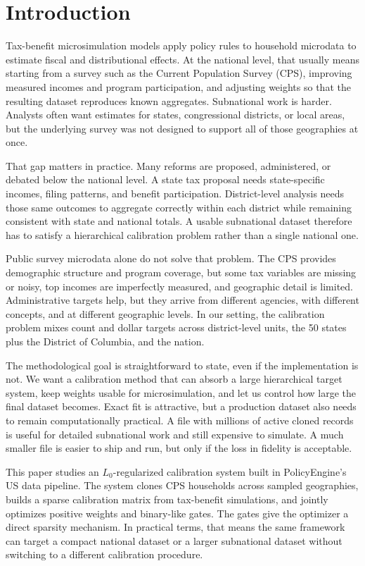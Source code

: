 \section{Introduction}
\label{sec:introduction}

Tax-benefit microsimulation models apply policy rules to household microdata to estimate fiscal
and distributional effects. At the national level, that usually means starting from a survey such
as the Current Population Survey (CPS), improving measured incomes and program participation, and
adjusting weights so that the resulting dataset reproduces known aggregates. Subnational work is
harder. Analysts often want estimates for states, congressional districts, or local areas, but the
underlying survey was not designed to support all of those geographies at once.

That gap matters in practice. Many reforms are proposed, administered, or debated below the
national level. A state tax proposal needs state-specific incomes, filing patterns, and benefit
participation. District-level analysis needs those same outcomes to aggregate correctly within each
district while remaining consistent with state and national totals. A usable subnational dataset
therefore has to satisfy a hierarchical calibration problem rather than a single national one.

Public survey microdata alone do not solve that problem. The CPS provides demographic structure and
program coverage, but some tax variables are missing or noisy, top incomes are imperfectly
measured, and geographic detail is limited. Administrative targets help, but they arrive from
different agencies, with different concepts, and at different geographic levels. In our setting,
the calibration problem mixes count and dollar targets across district-level units, the 50 states
plus the District of Columbia, and the nation.

The methodological goal is straightforward to state, even if the implementation is not. We want a
calibration method that can absorb a large hierarchical target system, keep weights usable for
microsimulation, and let us control how large the final dataset becomes. Exact fit is attractive,
but a production dataset also needs to remain computationally practical. A file with millions of
active cloned records is useful for detailed subnational work and still expensive to simulate. A
much smaller file is easier to ship and run, but only if the loss in fidelity is acceptable.

This paper studies an $L_0$-regularized calibration system built in PolicyEngine's US data
pipeline. The system clones CPS households across sampled geographies, builds a sparse calibration
matrix from tax-benefit simulations, and jointly optimizes positive weights and binary-like gates.
The gates give the optimizer a direct sparsity mechanism. In practical terms, that means the same
framework can target a compact national dataset or a larger subnational dataset without switching
to a different calibration procedure.

